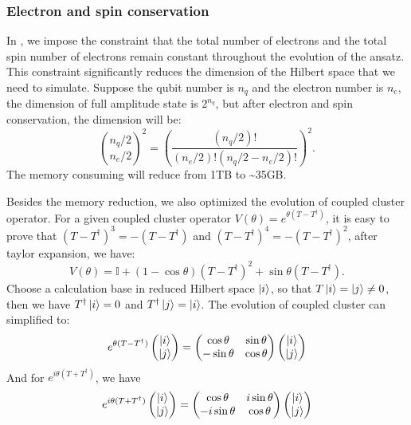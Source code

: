 \subsubsection{Electron and spin conservation}
In \QuPack, we impose the constraint that the total number of electrons and the total spin number of electrons remain constant throughout the evolution of the ansatz. This constraint significantly reduces the dimension of the Hilbert space that we need to simulate. Suppose the qubit number is $n_q$ and the electron number is $n_e$, the dimension of full amplitude state is $2^{n_q}$, but after electron and spin conservation, the dimension will be:
\begin{equation}
    \binom{n_q/2}{n_e/2}^2=\left(\frac{(n_q/2)!}{(n_e/2)!(n_q/2-n_e/2)!}\right)^2.
\end{equation}
The memory consuming will reduce from 1TB to \~{}35GB.

Besides the memory reduction, we also optimized the evolution of coupled cluster operator. For a given coupled cluster operator $V(\theta)=e^{\theta(T-T^\dagger)}$, it is easy to prove that $(T-T^\dagger)^3 = - (T-T^\dagger)$ and $(T-T^\dagger)^4 = -(T-T^\dagger)^2$, after taylor expansion, we have:
\begin{equation}
    V(\theta) = \mathbb{I} + ( 1-\cos\theta)(T-T^\dagger)^2 + \sin\theta (T-T^\dagger).
\end{equation}
Choose a calculation base in reduced Hilbert space $\ket{i}$, so that $T\ket{i} = \ket{j}\neq0$, then we have $T^\dagger\ket{i}=0$ and $T^\dagger\ket{j}=\ket{i}$. The evolution of coupled cluster can simplified to:
\begin{equation}
    e^{\theta(T-T^\dagger)}\begin{pmatrix}
        \ket{i} \\\ket{j}
    \end{pmatrix}=\begin{pmatrix}
        \cos\theta  & \sin\theta \\
        -\sin\theta & \cos\theta
    \end{pmatrix}\begin{pmatrix}
        \ket{i} \\\ket{j}
    \end{pmatrix}
\end{equation}
And for $e^{i\theta(T+T^\dagger)}$, we have
\begin{equation}
    e^{i\theta(T+T^\dagger)}\begin{pmatrix}
        \ket{i} \\\ket{j}
    \end{pmatrix}=\begin{pmatrix}
        \cos\theta   & i\sin\theta \\
        -i\sin\theta & \cos\theta
    \end{pmatrix}\begin{pmatrix}
        \ket{i} \\\ket{j}
    \end{pmatrix}
\end{equation}

